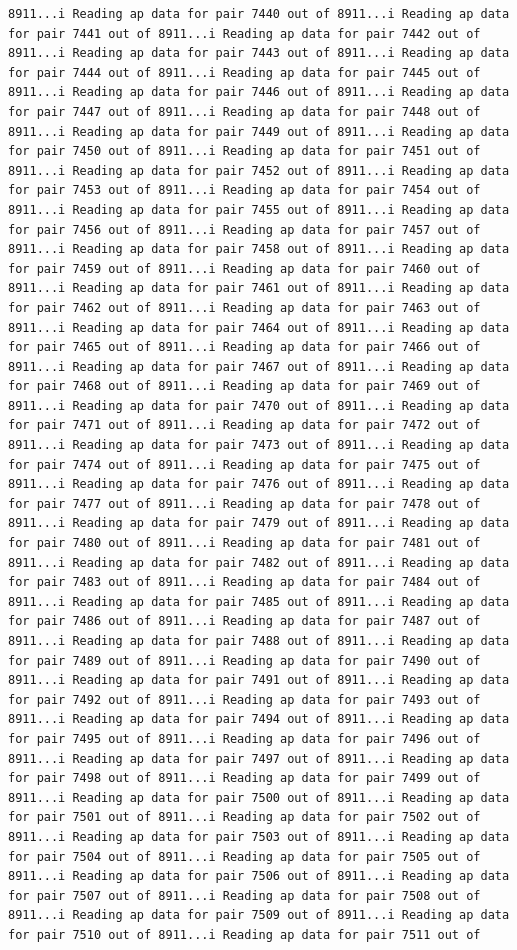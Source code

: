 \documentclass[
]{article}
\begin{document}
\begin{verbatim}
8911...i Reading ap data for pair 7440 out of 8911...i Reading ap data for pair 7441 out of 8911...i Reading ap data for pair 7442 out of 8911...i Reading ap data for pair 7443 out of 8911...i Reading ap data for pair 7444 out of 8911...i Reading ap data for pair 7445 out of 8911...i Reading ap data for pair 7446 out of 8911...i Reading ap data for pair 7447 out of 8911...i Reading ap data for pair 7448 out of 8911...i Reading ap data for pair 7449 out of 8911...i Reading ap data for pair 7450 out of 8911...i Reading ap data for pair 7451 out of 8911...i Reading ap data for pair 7452 out of 8911...i Reading ap data for pair 7453 out of 8911...i Reading ap data for pair 7454 out of 8911...i Reading ap data for pair 7455 out of 8911...i Reading ap data for pair 7456 out of 8911...i Reading ap data for pair 7457 out of 8911...i Reading ap data for pair 7458 out of 8911...i Reading ap data for pair 7459 out of 8911...i Reading ap data for pair 7460 out of 8911...i Reading ap data for pair 7461 out of 8911...i Reading ap data for pair 7462 out of 8911...i Reading ap data for pair 7463 out of 8911...i Reading ap data for pair 7464 out of 8911...i Reading ap data for pair 7465 out of 8911...i Reading ap data for pair 7466 out of 8911...i Reading ap data for pair 7467 out of 8911...i Reading ap data for pair 7468 out of 8911...i Reading ap data for pair 7469 out of 8911...i Reading ap data for pair 7470 out of 8911...i Reading ap data for pair 7471 out of 8911...i Reading ap data for pair 7472 out of 8911...i Reading ap data for pair 7473 out of 8911...i Reading ap data for pair 7474 out of 8911...i Reading ap data for pair 7475 out of 8911...i Reading ap data for pair 7476 out of 8911...i Reading ap data for pair 7477 out of 8911...i Reading ap data for pair 7478 out of 8911...i Reading ap data for pair 7479 out of 8911...i Reading ap data for pair 7480 out of 8911...i Reading ap data for pair 7481 out of 8911...i Reading ap data for pair 7482 out of 8911...i Reading ap data for pair 7483 out of 8911...i Reading ap data for pair 7484 out of 8911...i Reading ap data for pair 7485 out of 8911...i Reading ap data for pair 7486 out of 8911...i Reading ap data for pair 7487 out of 8911...i Reading ap data for pair 7488 out of 8911...i Reading ap data for pair 7489 out of 8911...i Reading ap data for pair 7490 out of 8911...i Reading ap data for pair 7491 out of 8911...i Reading ap data for pair 7492 out of 8911...i Reading ap data for pair 7493 out of 8911...i Reading ap data for pair 7494 out of 8911...i Reading ap data for pair 7495 out of 8911...i Reading ap data for pair 7496 out of 8911...i Reading ap data for pair 7497 out of 8911...i Reading ap data for pair 7498 out of 8911...i Reading ap data for pair 7499 out of 8911...i Reading ap data for pair 7500 out of 8911...i Reading ap data for pair 7501 out of 8911...i Reading ap data for pair 7502 out of 8911...i Reading ap data for pair 7503 out of 8911...i Reading ap data for pair 7504 out of 8911...i Reading ap data for pair 7505 out of 8911...i Reading ap data for pair 7506 out of 8911...i Reading ap data for pair 7507 out of 8911...i Reading ap data for pair 7508 out of 8911...i Reading ap data for pair 7509 out of 8911...i Reading ap data for pair 7510 out of 8911...i Reading ap data for pair 7511 out of 
\end{verbatim}
\end{document}
